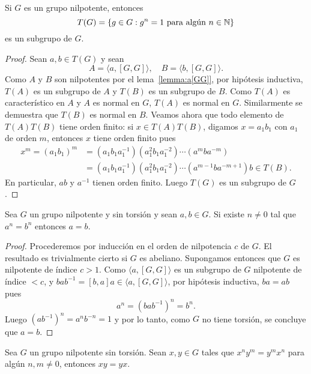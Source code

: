 \begin{theorem}
	\label{theorem:T(nilpotent)}
	Si $G$ es un grupo nilpotente, entonces
	\[
	T(G)=\{g\in G:g^n=1\text{ para algún $n\in\mathbb{N}$}\}
	\]
	es un subgrupo de $G$. 
\end{theorem}

\begin{proof}
	Sean $a,b\in T(G)$ y sean
	\[
		A=\langle a,[G,G]\rangle,\quad
		B=\langle b,[G,G]\rangle.
	\]
	Como $A$ y $B$ son nilpotentes por el lema~\ref{lemma:a[GG]}, por hipótesis
	inductiva, $T(A)$ es un subgrupo de $A$ y $T(B)$ es un subgrupo de $B$.
	Como $T(A)$ es característico en $A$ y $A$ es normal en $G$, $T(A)$ es
	normal en $G$. Similarmente se demuestra que $T(B)$ es normal en $B$.  
	Veamos ahora que todo elemento de $T(A)T(B)$ tiene orden finito: si
	$x\in T(A)T(B)$, digamos $x=a_1b_1$ con
	$a_1$ de orden $m$, entonces $x$ tiene orden finito pues 
	\begin{align*}
	x^m=(a_1b_1)^m&=(a_1b_1a_1^{-1})(a_1^2b_1a_1^{-2})\cdots (a^m b a^{-m})\\
	&=(a_1b_1a_1^{-1})(a_1^2b_1a_1^{-2})\cdots (a^{m-1} b a^{-m+1})b\in T(B).
	\end{align*}
	En particular, $ab$ y $a^{-1}$ tienen orden finito. Luego $T(G)$ es un
	subgrupo de $G$.
\end{proof}

\begin{theorem}
	\label{theorem:a=b}
	Sea $G$ un grupo nilpotente y sin torsión y sean $a,b\in G$. Si existe
	$n\ne 0$ tal que $a^n=b^n$ entonces $a=b$.
\end{theorem}

\begin{proof}
	Procederemos por inducción en el orden de nilpotencia $c$ de $G$. El
	resultado es trivialmente cierto si $G$ es abeliano. Supongamos entonces
	que $G$ es nilpotente de índice $c>1$. Como $\langle a,[G,G]\rangle$ es un
	subgrupo de $G$ nilpotente de índice $<c$, y $bab^{-1}=[b,a]a\in \langle
	a,[G,G]\rangle$, por hipótesis inductiva, $ba=ab$ pues 
	\[
		a^n=(bab^{-1})^n=b^n.
	\]
	Luego $(ab^{-1})^n=a^nb^{-n}=1$ y por lo tanto, como $G$ no tiene torsión,
	se concluye que $a=b$.
\end{proof}

\begin{corollary}
	Sea $G$ un grupo nilpotente sin torsión. Sean $x,y\in G$ tales que
	$x^ny^m=y^mx^n$ para algún $n,m\ne 0$, entonces $xy=yx$.
\end{corollary}

